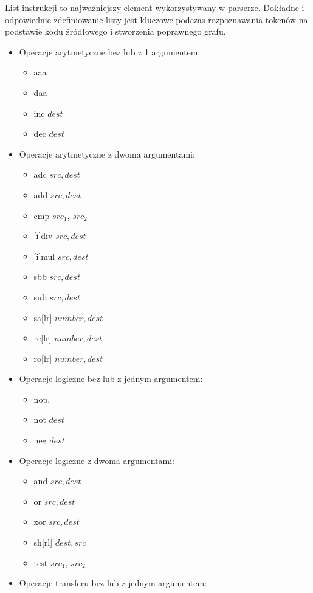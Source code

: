 \documentclass[a4paper,12pt,twoside]{article}
\begin{document}
List instrukcji to najważniejszy element wykorzystywany w parserze. Dokładne i odpowiednie zdefiniowanie listy jest kluczowe podczas rozpoznawania tokenów na podstawie kodu źródłowego i stworzenia poprawnego grafu.

\begin{itemize}
\item Operacje arytmetyczne bez lub z 1 argumentem:
	\begin{itemize}
	\item aaa
	\item daa
	\item inc $dest$
	\item dec $dest$
	\end{itemize}
\item Operacje arytmetyczne z dwoma argumentami:
	\begin{itemize}
	\item adc $src, dest$
	\item add $src, dest$
	\item cmp $src_1$, $src_2$
	\item {[i]}div $src, dest$
	\item {[i]}mul $src, dest$
	\item sbb $src, dest$
	\item sub $src, dest$
	\item sa[lr] $number, dest$
	\item rc[lr] $number, dest$
	\item ro[lr] $number, dest$
	\end{itemize}
\item Operacje logiczne bez lub z jednym argumentem:
	\begin{itemize}
	\item nop,
	\item not $dest$
	\item neg $dest$
	\end{itemize}
\item Operacje logiczne z dwoma argumentami:
	\begin{itemize}
	\item and $src, dest$
	\item or $src, dest$
	\item xor $src, dest$
	\item sh[rl] $dest, src$
	\item test $src_1$, $src_2$
	\end{itemize}
\item Operacje transferu bez lub z jednym argumentem:
	\begin{itemize}

\end{itemize}
\end{itemize}
\end{document}
